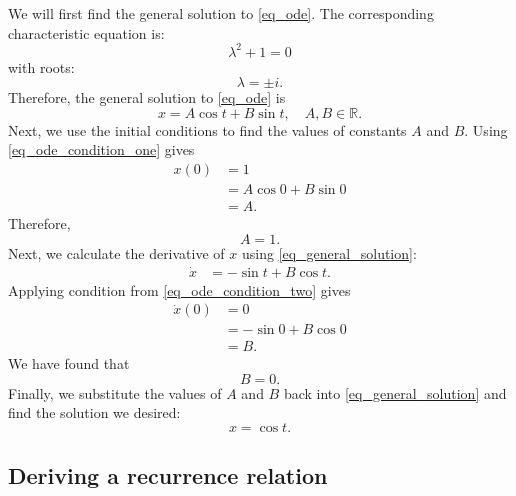 We will first find the general solution to \autoref{eq_ode}. The corresponding characteristic equation is:
\[
  \lambda^2 + 1 = 0
\]
with roots:
\[
  \lambda = \pm i.
\]
Therefore, the general solution to \autoref{eq_ode} is
\begin{equation}
  x = A \cos t + B \sin t, \quad A, B \in \mathbb{R}.
  \label{eq_general_solution}
\end{equation}
Next, we use the initial conditions to find the values of constants $A$ and $B$. Using \autoref{eq_ode_condition_one} gives
\begin{align*}
  x(0) &= 1 \\
      &= A \cos 0 + B \sin 0 \\
      &= A.
\end{align*}
Therefore,
\[
  A = 1.
\]
Next, we calculate the derivative of $x$ using \autoref{eq_general_solution}:
\begin{align*}
  \dot{x} &= -\sin t + B \cos t.
\end{align*}
Applying condition from \autoref{eq_ode_condition_two} gives
\begin{align*}
  \dot{x}(0) &= 0 \\
      &= -\sin 0 + B \cos 0 \\
      &= B.
\end{align*}
We have found that
\[
  B = 0.
\]
Finally, we substitute the values of $A$ and $B$ back into \autoref{eq_general_solution} and find the solution we desired:
\[
  \boxed{x = \cos t.}
\]


\subsection{Deriving a recurrence relation}

